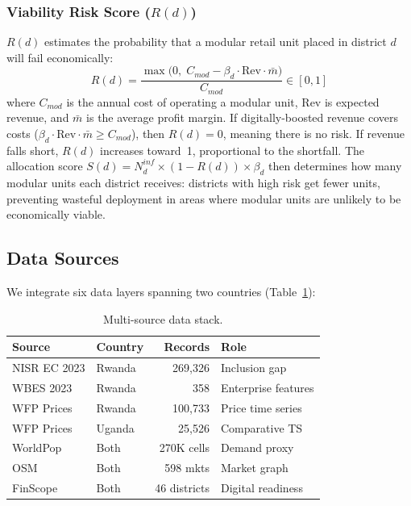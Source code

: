 \documentclass{article}
\begin{document}
\subsubsection{Viability Risk Score ($R(d)$)}
$R(d)$ estimates the probability that a modular retail unit placed in district $d$ will fail economically:
\begin{equation}
    R(d) = \frac{\max\!\bigl(0,\; C_{\textit{mod}} - \beta_d \cdot \text{Rev} \cdot \bar{m}\bigr)}{C_{\textit{mod}}} \in [0,1]
    \label{eq:risk}
\end{equation}
where $C_{\textit{mod}}$ is the annual cost of operating a modular unit, $\text{Rev}$ is expected revenue, and $\bar{m}$ is the average profit margin.
If digitally-boosted revenue covers costs ($\beta_d \cdot \text{Rev} \cdot \bar{m} \geq C_{\textit{mod}}$), then $R(d) = 0$, meaning there is no risk.
If revenue falls short, $R(d)$ increases toward~1, proportional to the shortfall.
The allocation score $S(d) = N_d^{\textit{inf}} \times (1 - R(d)) \times \beta_d$ then determines how many modular units each district receives: districts with high risk get fewer units, preventing wasteful deployment in areas where modular units are unlikely to be economically viable.

\subsection{Data Sources}

We integrate six data layers spanning two countries (Table~\ref{tab:data}):

\begin{table}[t]
    \centering
    \caption{Multi-source data stack.}
    \label{tab:data}
    \begin{tabular}{@{}llrl@{}}
        \toprule
        Source & Country & Records & Role \\
        \midrule
        NISR EC 2023 & Rwanda & 269,326 & Inclusion gap \\
        WBES 2023 & Rwanda & 358 & Enterprise features \\
        WFP Prices & Rwanda & 100,733 & Price time series \\
        WFP Prices & Uganda & 25,526 & Comparative TS \\
        WorldPop & Both & 270K cells & Demand proxy \\
        OSM & Both & 598 mkts & Market graph \\
        FinScope & Both & 46 districts & Digital readiness \\
        \bottomrule
    \end{tabular}
\end{table}
\end{document}
